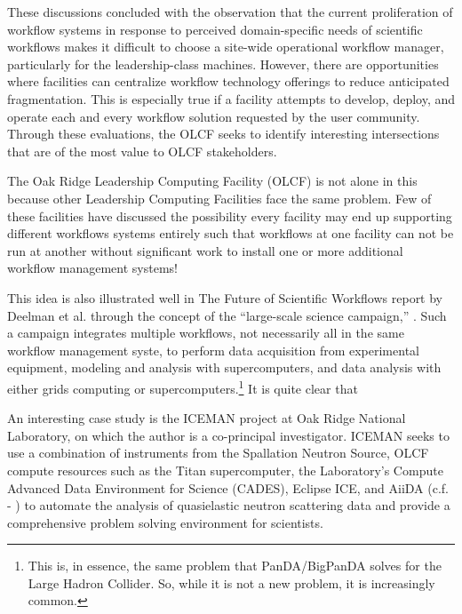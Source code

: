 \begin{displayquote}
These discussions concluded with the observation that the current proliferation
of workflow systems in response to perceived domain-specific needs of 
scientific workflows makes it difficult to choose a site-wide operational
workflow manager, particularly for the leadership-class machines. However,
there are opportunities where facilities can centralize workflow technology 
offerings to reduce anticipated fragmentation. This is especially true if a 
facility attempts to develop, deploy, and operate each and every workflow 
solution requested by the user community. Through these evaluations, the OLCF
seeks to identify interesting intersections that are of the most value to OLCF
stakeholders.
\end{displayquote}

The Oak Ridge Leadership Computing Facility (OLCF) is not alone in this
because other Leadership Computing Facilities face the same problem. Few
of these facilities have discussed the possibility every facility may end up
supporting different workflows systems entirely such that workflows at
one facility can not be run at another without significant work to
install one or more additional workflow management systems!

This idea is also illustrated well in The Future of Scientific Workflows report by Deelman et  
al. through the concept of the ``large-scale science campaign,'' \cite{deelman_future_2015}.
Such a campaign integrates multiple workflows, not necessarily all in the same workflow
management syste, to perform data acquisition from experimental equipment, modeling and analysis with supercomputers, and data analysis with either grids computing or
supercomputers.\footnote{This is, in essence, the same problem that
PanDA/BigPanDA solves for the Large Hadron Collider. So, while it is not
a new problem, it is increasingly common.} It is quite clear that 

An interesting case study is the ICEMAN project at Oak Ridge National
Laboratory, on which the author is a co-principal investigator. ICEMAN
seeks to use a combination of instruments from the Spallation Neutron
Source, OLCF compute resources such as the Titan supercomputer, the
Laboratory's Compute Advanced Data Environment for Science (CADES),
Eclipse ICE, and AiiDA (c.f. - \cite{pizzi_aiida:_2016}) to automate the
analysis of quasielastic neutron scattering data and provide a
comprehensive problem solving environment for scientists.

